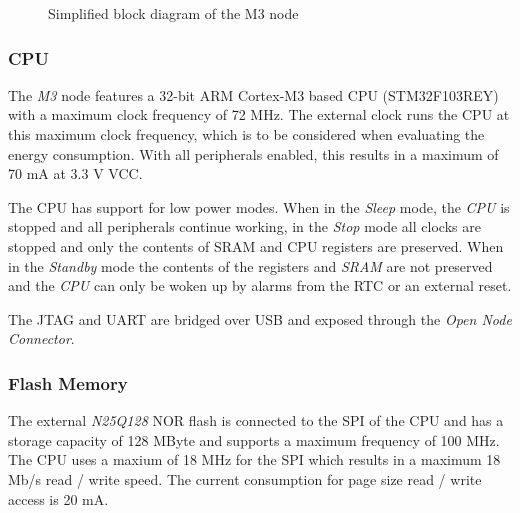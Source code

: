 \begin{figure}
  \caption{Simplified block diagram of the M3 node}
  \label{fig:m3node}
\end{figure}


\subsubsection{CPU}

The \emph{M3} node features a 32-bit ARM Cortex-M3 based CPU (STM32F103REY)
\cite{stm32f103re} with a maximum clock frequency of 72 MHz. The external clock
runs the \ac{CPU} at this maximum clock frequency, which is to be considered
when evaluating the energy consumption. With all peripherals enabled, this
results in a maximum of 70 mA at 3.3 V \ac{VCC}.

The \ac{CPU} has support for low power modes. When in the \emph{Sleep} mode, the
\emph{CPU} is stopped and all peripherals continue working, in the \emph{Stop}
mode all clocks are stopped and only the contents of \ac{SRAM} and \ac{CPU}
registers are preserved. When in the \emph{Standby} mode the contents of the
registers and \emph{SRAM} are not preserved and the \emph{CPU} can only be woken
up by alarms from the \ac{RTC} or an external reset.

The \ac{JTAG} and \ac{UART} are bridged over \ac{USB} and exposed through the
\emph{Open Node Connector}.

\subsubsection{Flash Memory}

The external \emph{N25Q128} \cite{N25Q128} NOR flash is connected to the
\ac{SPI} of the \ac{CPU} and has a storage capacity of 128 MByte and supports a
maximum frequency of 100 MHz. The \ac{CPU} uses a maxium of 18 MHz for the
\ac{SPI} which results in a maximum 18 Mb/s read / write speed. The
current consumption for page size read / write access is 20 mA.

